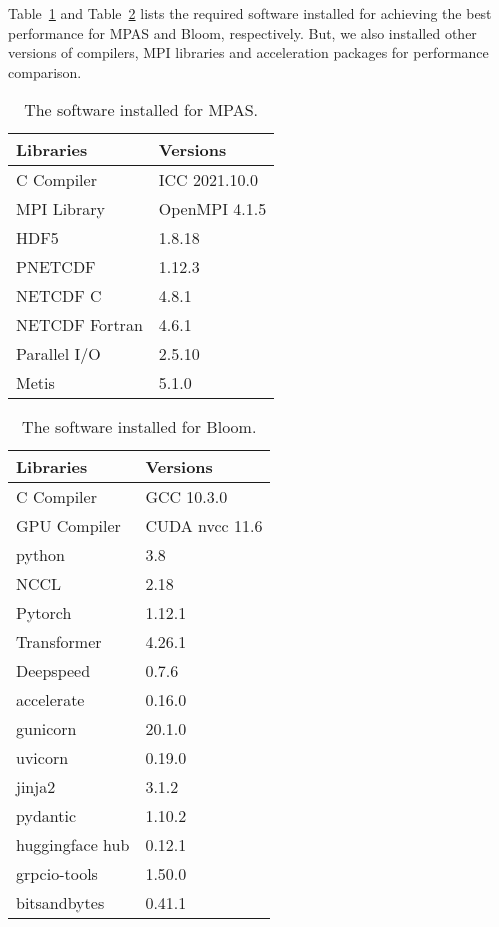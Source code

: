 Table~\ref{table:software-CPU} and Table~\ref{table:software-GPU} lists the required software installed for achieving the best performance for MPAS and Bloom, respectively. But, we also installed other versions of compilers, MPI libraries and acceleration packages for performance comparison. 

\begin{table}[t]
    \centering
    \caption{The software installed for MPAS.}
    \begin{tabular}{ll}
        \toprule
        Libraries & Versions  \\
        \midrule
        C Compiler & ICC 2021.10.0 \\
        MPI Library & OpenMPI 4.1.5 \\
        HDF5 & 1.8.18 \\
        PNETCDF & 1.12.3 \\
        NETCDF C & 4.8.1 \\
        NETCDF Fortran & 4.6.1 \\
        Parallel I/O & 2.5.10 \\
        Metis & 5.1.0 \\
        \bottomrule
    \end{tabular}
    \label{table:software-CPU}
\end{table}


\begin{table}[th]
    \centering
    \caption{The software installed for Bloom.}
    \begin{tabular}{ll}
        \toprule
        Libraries & Versions  \\
        \midrule
        C Compiler & GCC 10.3.0 \\
        GPU Compiler & CUDA nvcc 11.6 \\
        python & 3.8 \\
        NCCL & 2.18 \\
        Pytorch & 1.12.1 \\
        Transformer & 4.26.1 \\
        Deepspeed & 0.7.6 \\
        accelerate & 0.16.0  \\
        gunicorn & 20.1.0 \\
        uvicorn & 0.19.0 \\
        jinja2 & 3.1.2 \\
        pydantic & 1.10.2 \\
        huggingface hub & 0.12.1 \\
        grpcio-tools & 1.50.0 \\
        bitsandbytes & 0.41.1 \\

        \bottomrule
    \end{tabular}
    \label{table:software-GPU}
\end{table}